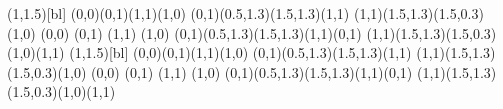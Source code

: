\savebox{\cube}(1,1.5)[bl]{%
  \roundjoin
  \color{white}
  \polygon*(0,0)(0,1)(1,1)(1,0)
  \color{lightgray}
  \polygon*(0,1)(0.5,1.3)(1.5,1.3)(1,1)
  \color{gray}
  \polygon*(1,1)(1.5,1.3)(1.5,0.3)(1,0)
  \color{black}
  \moveto(0,0)
  \lineto(0,1) \lineto(1,1) \lineto(1,0)
  \closepath
  \strokepath
  \polyline(0,1)(0.5,1.3)(1.5,1.3)(1,1)(0,1)
  \polyline(1,1)(1.5,1.3)(1.5,0.3)(1,0)(1,1)
}
\savebox{\ccube}(1,1.5)[bl]{%
  \roundjoin
  \color{indexedface}
  \polygon*(0,0)(0,1)(1,1)(1,0)
  \color{indexedtop}
  \polygon*(0,1)(0.5,1.3)(1.5,1.3)(1,1)
  \color{indexedside}
  \polygon*(1,1)(1.5,1.3)(1.5,0.3)(1,0)
  \color{black}
  \moveto(0,0)
  \lineto(0,1) \lineto(1,1) \lineto(1,0)
  \closepath
  \strokepath
  \polyline(0,1)(0.5,1.3)(1.5,1.3)(1,1)(0,1)
  \polyline(1,1)(1.5,1.3)(1.5,0.3)(1,0)(1,1)
}
